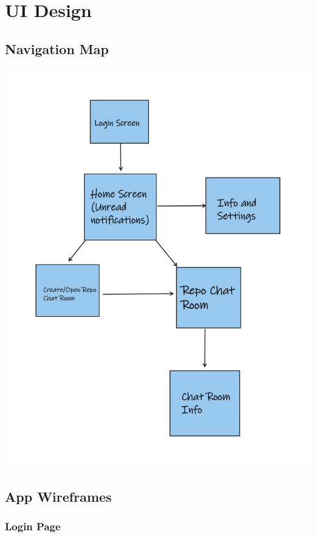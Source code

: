 \documentclass{report}
\begin{document}
\chapter{UI Design}

\section{Navigation Map}
\begin{center}
    \includegraphics[width=\textwidth]{nav-graph}
\end{center}


\section{App Wireframes}

\newpage
\subsection{Login Page}
\end{document}
